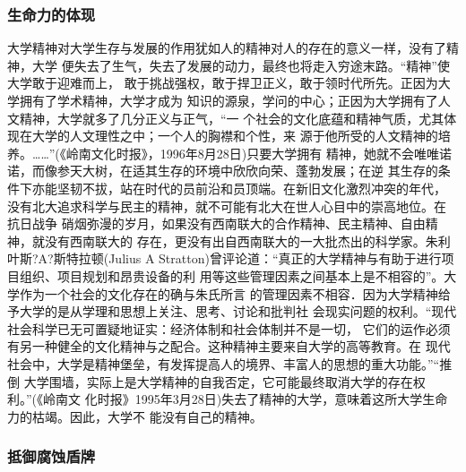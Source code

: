 \documentclass[11pt]{ctexart}
\begin{document}
{{{{\subsubsection{生命力的体现}
\label{sec:orgf077735}

大学精神对大学生存与发展的作用犹如人的精神对人的存在的意义一样，没有了精神，大学
便失去了生气，失去了发展的动力，最终也将走入穷途末路。“精神”使大学敢于迎难而上，
敢于挑战强权，敢于捍卫正义，敢于领时代所先。正因为大学拥有了学术精神，大学才成为
知识的源泉，学问的中心；正因为大学拥有了人文精神，大学就多了几分正义与正气，“一
个社会的文化底蕴和精神气质，尤其体现在大学的人文理性之中；一个人的胸襟和个性，来
源于他所受的人文精神的培养。……”(《岭南文化时报》，1996年8月28日)只要大学拥有
精神，她就不会唯唯诺诺，而像参天大树，在适其生存的环境中欣欣向荣、蓬勃发展；在逆
其生存的条件下亦能坚韧不拔，站在时代的员前沿和员顶端。在新旧文化激烈冲突的年代，
没有北大追求科学与民主的精神，就不可能有北大在世人心目中的崇高地位。在 抗日战争
硝烟弥漫的岁月，如果没有西南联大的合作精神、民主精神、自由精神，就没有西南联大的
存在，更没有出自西南联大的一大批杰出的科学家。朱利叶斯?A?斯特拉顿(Julius A
Stratton)曾评论道：“真正的大学精神与有助于进行项目组织、项目规划和昂贵设备的利
用等这些管理因素之间基本上是不相容的”。大学作为一个社会的文化存在的确与朱氏所言
的管理因素不相容．因为大学精神给予大学的是从学理和思想上关注、思考、讨论和批判社
会现实问题的权利。“现代社会科学已无可置疑地证实：经济体制和社会体制并不是一切，
它们的运作必须有另一种健全的文化精神与之配合。这种精神主要来自大学的高等教育。在
现代社会中，大学是精神堡垒，有发挥提高人的境界、丰富人的思想的重大功能。”“推倒
大学围墙，实际上是大学精神的自我否定，它可能最终取消大学的存在权利。”(《岭南文
化时报》1995年3月28日)失去了精神的大学，意味着这所大学生命力的枯竭。因此，大学不
能没有自己的精神。


\subsubsection{抵御腐蚀盾牌}
\label{sec:org146fd2d}

}}}}
\end{document}
